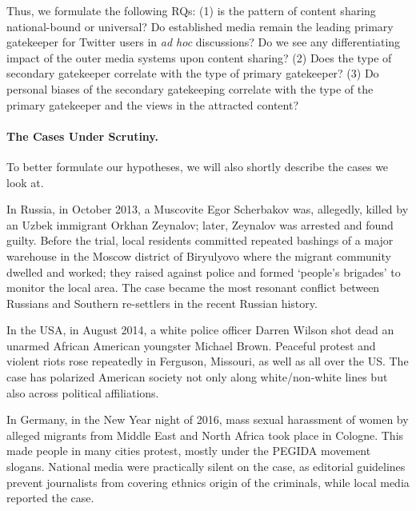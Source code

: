 Thus, we formulate the following RQs: (1) is the pattern of content sharing national-bound or universal? Do established media remain the leading primary gatekeeper for Twitter users in \textit{ad hoc} discussions? Do we see any differentiating impact of the outer media systems upon content sharing? (2) Does the type of secondary gatekeeper correlate with the type of primary gatekeeper? (3) Do personal biases of the secondary gatekeeping correlate with the type of the primary gatekeeper and the views in the attracted content?

\paragraph{The Cases Under Scrutiny.} To better formulate our hypotheses, we will also shortly describe the cases we look at.

In Russia, in October 2013, a Muscovite Egor Scherbakov was, allegedly, killed by an Uzbek immigrant Orkhan Zeynalov; later, Zeynalov was arrested and found guilty. Before the trial, local residents committed repeated bashings of a major warehouse in the Moscow district of Biryulyovo where the migrant community dwelled and worked; they raised against police and formed ‘people’s brigades’ to monitor the local area. The case became the most resonant conflict between Russians and Southern re-settlers in the recent Russian history.

In the USA, in August 2014, a white police officer Darren Wilson shot dead an unarmed African American youngster Michael Brown. Peaceful protest and violent riots rose repeatedly in Ferguson, Missouri, as well as all over the US. The case has polarized American society not only along white/non-white lines but also across political affiliations. 

In Germany, in the New Year night of 2016, mass sexual harassment of women by alleged migrants from Middle East and North Africa took place in Cologne. This made people in many cities protest, mostly under the PEGIDA movement slogans. National media were practically silent on the case, as editorial guidelines prevent journalists from covering ethnics origin of the criminals, while local media reported the case.

